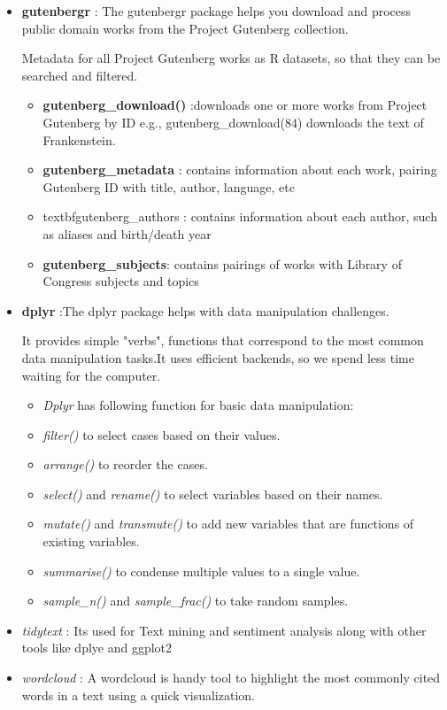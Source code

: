 \documentclass[12pt, letterpaper, twoside]{article}\usepackage[]{graphicx}\usepackage[]{color}
\begin{document}
\begin{itemize}
\item
\textbf{gutenbergr} :  The gutenbergr package helps you download and process public domain works from the Project Gutenberg collection.

Metadata for all Project Gutenberg works as R datasets, so that they can be searched and filtered.\citep{cranorg}
\begin{itemize}
\item
\textbf{gutenberg\_download()} :downloads one or more works from Project Gutenberg by ID  e.g., gutenberg\_download(84) downloads the text of Frankenstein.
\item
\textbf{gutenberg\_metadata} :  contains information about each work, pairing Gutenberg ID with title, author, language, etc
\item
textbf{gutenberg\_authors} : contains information about each author, such as aliases and birth/death year
\item
\textbf{gutenberg\_subjects}: contains pairings of works with Library of Congress subjects and topics
\end{itemize}

\item
\textbf{dplyr} :The dplyr package helps with data manipulation challenges.

It provides simple "verbs", functions that correspond to the most common data manipulation tasks.It uses efficient backends, so we spend less time waiting for the computer.

\begin{itemize}
\item \emph{Dplyr} has following function for basic data manipulation:
\item \emph{filter()} to select cases based on their values.
\item \emph{arrange()} to reorder the cases.
\item \emph{select()} and \emph{rename()} to select variables based on their names.
\item \emph{mutate()} and \emph{transmute()} to add new variables that are functions of existing variables.
\item \emph{summarise()} to condense multiple values to a single value.
\item \emph{sample\_n()} and \emph{sample\_frac()} to take random samples.
\end{itemize}


\item
\emph{tidytext} : Its used for Text mining and sentiment analysis along with other tools like dplye and ggplot2

\item
\emph{wordcloud} : A wordcloud is handy tool to highlight the most commonly cited words in a text using a quick visualization.

\end{itemize}
\end{document}
